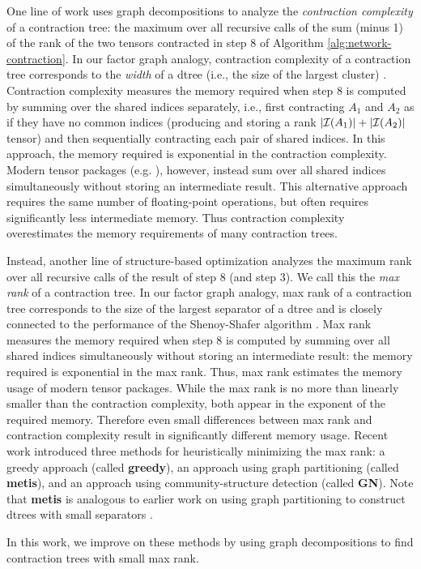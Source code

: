 One line of work \cite{MS08,DFGHSW18} uses graph decompositions to analyze the \emph{contraction complexity} of a contraction tree: the maximum over all recursive calls of the sum (minus 1) of the rank of the two tensors contracted in step 8 of Algorithm \ref{alg:network-contraction}. In our factor graph analogy, contraction complexity of a contraction tree corresponds to the \emph{width} of a dtree (i.e., the size of the largest cluster) \cite{darwiche01b}. Contraction complexity measures the memory required when step 8 is computed
by summing over the shared indices separately, i.e., first contracting $A_1$ and $A_2$ as if they have no common indices (producing and storing a rank $|\mathcal{I}(A_1)|+|\mathcal{I}(A_2)|$ tensor) and then sequentially contracting each pair of shared indices. In this approach, the memory required is exponential in the contraction complexity. Modern tensor packages (e.g. ), however, instead sum over all shared indices simultaneously without storing an intermediate result. This alternative approach requires the same number of floating-point operations, but often requires significantly less intermediate memory. Thus contraction complexity overestimates the memory requirements of many contraction trees. 

Instead, another line of structure-based optimization analyzes the maximum rank over all recursive calls of the result of step 8 (and step 3). We call this the \emph{max rank} of a contraction tree. In our factor graph analogy, max rank of a contraction tree corresponds to the size of the largest separator of a dtree \cite{darwiche01b} and is closely connected to the performance of the Shenoy-Shafer algorithm \cite{shenoy97,SS08}. Max rank measures the memory required when step 8 is computed by summing over all shared indices simultaneously without storing an intermediate result: the memory required is exponential in the max rank. Thus, max rank estimates the memory usage of modern tensor packages. While the max rank is no more than linearly smaller than the contraction complexity, both appear in the exponent of the required memory. Therefore even small differences between max rank and contraction complexity result in significantly different memory usage. Recent work \cite{KCMR18} introduced three methods for heuristically minimizing the max rank: a greedy approach (called \textbf{greedy}), an approach using graph partitioning (called \textbf{metis}), and an approach using community-structure detection (called \textbf{GN}). Note that \textbf{metis} is analogous to earlier work on using graph partitioning to construct dtrees with small separators \cite{darwiche01b}.

In this work, we improve on these methods by using graph decompositions to find contraction trees with small max rank.

